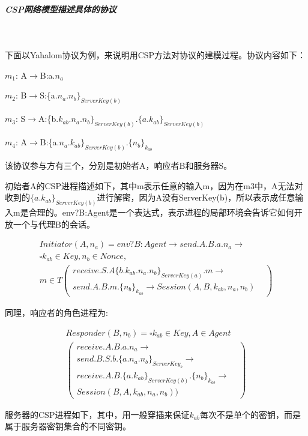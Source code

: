 \documentclass[cs4size,a4pape,UTF8]{ctexart}
\numberwithin{equation}{section}
\numberwithin{table}{section}
\numberwithin{figure}{section}
\begin{document}
\subparagraph{CSP网络模型描述具体的协议}\

下面以Yahalom协议为例，来说明用CSP方法对协议的建模过程。协议内容如下：

$m_{1}$:  A$\rightarrow$B:a.$n_{a}$

$m_{2}$:  B$\rightarrow$S:\{a.$n_{a}.n_{b}\}_{ServerKey(b)}$

$m_{3}$:  S$\rightarrow$A:\{b.$k_{ab}.n_{a}.n_{b}\}_{ServerKey(b)}.\{a.k_{ab}\}_{ServerKey(b)}$

$m_{4}$:  A$\rightarrow$B:\{a.$n_{a}.k_{ab}\}_{ServerKey(b)}.\{n_{b}\}_{k_{ab}}$

该协议参与方有三个，分别是初始者A，响应者B和服务器S。

初始者A的CSP进程描述如下，其中m表示任意的输入m，因为在m3中，A无法对收到的$\{a.k_{ab}\}_{ServerKey(b)}$进行解密，因为A没有ServerKey(b)，所以表示成任意输入m是合理的。env?B:Agent是一个表达式，表示进程的局部环境会告诉它如何开放一个与代理B的会话。

\begin{multline}
Initiator(A,n_{a})=env?B:Agent\rightarrow{send.A.B.a.n_{a}}\rightarrow\\
\square{k}_{ab}\in{Key},n_{b}\in{Nonce},\\
m\in{T}\left(
\begin{array}{lr}
	{receive.S.A\{b.k_{ab}.n_{a}.n_{b}\}_{ServerKey(a)}.m}\rightarrow& \\
	{send.A.B.m.\{n_{b}\}_{k_{ab}}}\rightarrow{Session(A,B,k_{ab},n_{a},n_{b})}&
\end{array}
\right)
\end{multline}

同理，响应者的角色进程为:

\begin{multline}
Responder(B,n_{b})=\square{k_{ab}}\in{Key},A\in{Agent} \\
\left(
\begin{array}{lr}
	{receive.A.B.a.n_{a}\rightarrow}& \\
	{send.B.S.b.\{a.n_{a}.n_{b}\}_{ServerKey_{b}}}\rightarrow& \\
	{receive.A.B.\{a.k_{ab}\}_{ServerKey(b)}.\{n_{b}\}_{k_{ab}}\rightarrow}& \\
	{Session(B,A,k_{ab},n_{a},n_{b})})&
\end{array}
\right)
\end{multline}

服务器的CSP进程如下，其中，用一般穿插来保证$k_{ab}$每次不是单个的密钥，而是属于服务器密钥集合的不同密钥。
\end{document}
